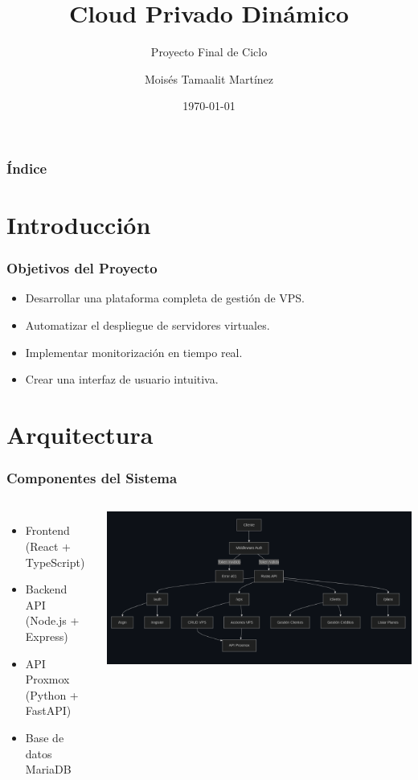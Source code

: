 \documentclass[aspectratio=169]{beamer}
\title{Cloud Privado Dinámico}
\subtitle{Proyecto Final de Ciclo}
\author{Moisés Tamaalit Martínez}
\institute{IES Ingeniero de la Cierva}
\date{\today}
\begin{document}
\begin{frame}
\titlepage
\end{frame}

\begin{frame}
\frametitle{Índice}
\tableofcontents
\end{frame}

\section{Introducción}

\begin{frame}
\frametitle{Objetivos del Proyecto}
\begin{itemize}
    \item Desarrollar una plataforma completa de gestión de VPS.
    \item Automatizar el despliegue de servidores virtuales.
    \item Implementar monitorización en tiempo real.
    \item Crear una interfaz de usuario intuitiva.
\end{itemize}
\end{frame}

\section{Arquitectura}

\begin{frame}
\frametitle{Componentes del Sistema}
\begin{columns}
\begin{itemize}
    \item Frontend (React + TypeScript)
    \item Backend API (Node.js + Express)
    \item API Proxmox (Python + FastAPI)
    \item Base de datos MariaDB
\end{itemize}
\includegraphics[width=\textwidth]{img/diagrama_backend.png}
\end{columns}
\end{frame}
\end{document}
